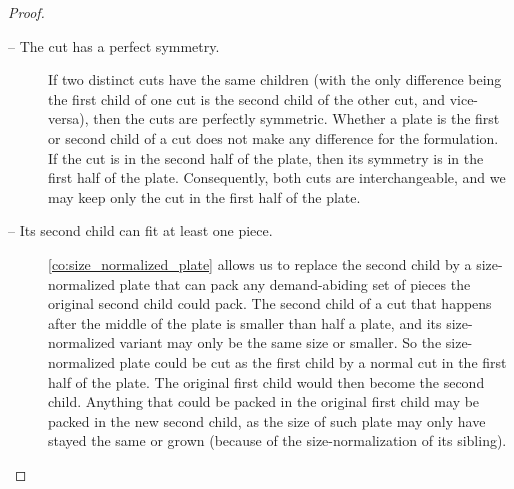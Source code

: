 \documentclass[smallextended]{svjour3}       %
\begin{document}
\begin{proof}
\begin{description}
\item[ -- The cut has a perfect symmetry.]
If two distinct cuts have the same children (with the only difference being the first child of one cut is the second child of the other cut, and vice-versa), then the cuts are perfectly symmetric.
Whether a plate is the first or second child of a cut does not make any difference for the formulation.
If the cut is in the second half of the plate, then its symmetry is in the first half of the plate.
Consequently, both cuts are interchangeable, and we may keep only the cut in the first half of the plate.
\item[ -- Its second child can fit at least one piece.]
\autoref{co:size_normalized_plate} allows us to replace the second child by a size-normalized plate that can pack any demand-abiding set of pieces the original second child could pack.
The second child of a cut that happens after the middle of the plate is smaller than half a plate, and its size-normalized variant may only be the same size or smaller.
So the size-normalized plate could be cut as the first child by a normal cut in the first half of the plate.
The original first child would then become the second child.
Anything that could be packed in the original first child may be packed in the new second child, as the size of such plate may only have stayed the same or grown (because of the size-normalization of its sibling).


\end{description}
\end{proof}
\end{document}
